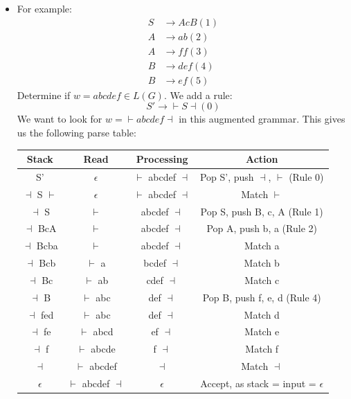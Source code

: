 \documentclass[12pt]{article}
\begin{document}
\begin{itemize}
\begin{itemize}
            \item For example:
                \begin{align*}
                    S &\rightarrow AcB (1)\\
                    A &\rightarrow ab (2)\\
                    A &\rightarrow ff (3)\\
                    B &\rightarrow def (4)\\
                    B &\rightarrow ef (5)
                \end{align*}
                Determine if $w = abcdef \in L(G)$.  We add a rule:
                $$S' \rightarrow \vdash S \dashv (0)$$
                We want to look for $w = \vdash abcdef \dashv$ in this augmented grammar.  This gives us the following parse table:\\
                \begin{tabular}{c|c|c|c}
                    Stack & Read & Processing & Action\\
                    \hline
                    S' & $\epsilon$ & $\vdash$ abcdef $\dashv$ & Pop S', push $\dashv$, $\vdash$ (Rule 0) \\
                    $\dashv$ S $\vdash$ & $\epsilon$ & $\vdash$ abcdef $\dashv$ & Match $\vdash$ \\
                    $\dashv$ S & $\vdash$ & abcdef $\dashv$ & Pop S, push B, c, A (Rule 1) \\
                    $\dashv$ BcA & $\vdash$ & abcdef $\dashv$ & Pop A, push b, a (Rule 2) \\ 
                    $\dashv$ Bcba & $\vdash$ & abcdef $\dashv$ & Match a \\
                    $\dashv$ Bcb & $\vdash$ a & bcdef $\dashv$ & Match b \\
                    $\dashv$ Bc & $\vdash$ ab & cdef $\dashv$ & Match c \\
                    $\dashv$ B & $\vdash$ abc & def $\dashv$ & Pop B, push f, e, d (Rule 4) \\
                    $\dashv$ fed & $\vdash$ abc & def $\dashv$ & Match d \\
                    $\dashv$ fe & $\vdash$ abcd & ef $\dashv$ & Match e \\
                    $\dashv$ f & $\vdash$ abcde & f $\dashv$ & Match f \\
                    $\dashv$ & $\vdash$ abcdef & $\dashv$ & Match $\dashv$ \\
                    $\epsilon$ & $\vdash$ abcdef $\dashv$ & $\epsilon$ & Accept, as stack = input = $\epsilon$

\end{tabular}
\end{itemize}
\end{itemize}
\end{document}
